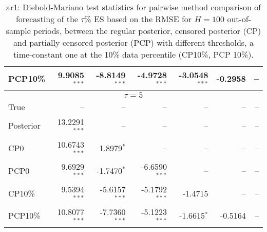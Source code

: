 {{\begin{table}
\begin{tabular}{l | rrrrrr}
PCP10\% & 9.9085$^{***}$ & -8.8149$^{***}$ & -4.9728$^{***}$ & -3.0548$^{***}$ & -0.2958\phantom{$^{***}$} &    --\phantom{$^{***}$}   \\ 
\hline 
\multicolumn{7}{c}{$\tau = 5$} \\ \hline 
True &    --\phantom{$^{***}$} &    --\phantom{$^{***}$} &    --\phantom{$^{***}$} &    --\phantom{$^{***}$} &    --\phantom{$^{***}$} &    --\phantom{$^{***}$}   \\ 
Posterior & 13.2291$^{***}$ &    --\phantom{$^{***}$} &    --\phantom{$^{***}$} &    --\phantom{$^{***}$} &    --\phantom{$^{***}$} &    --\phantom{$^{***}$}   \\ 
CP0 & 10.6743$^{***}$ & 1.8979$^{*}$\phantom{$^{**}$} &    --\phantom{$^{***}$} &    --\phantom{$^{***}$} &    --\phantom{$^{***}$} &    --\phantom{$^{***}$}   \\ 
PCP0 & 9.6929$^{***}$ & -1.7470$^{*}$\phantom{$^{**}$} & -6.6590$^{***}$ &    --\phantom{$^{***}$} &    --\phantom{$^{***}$} &    --\phantom{$^{***}$}   \\ 
CP10\% & 9.5394$^{***}$ & -5.6157$^{***}$ & -5.1792$^{***}$ & -1.4715\phantom{$^{***}$} &    --\phantom{$^{***}$} &    --\phantom{$^{***}$}   \\ 
PCP10\% & 10.8077$^{***}$ & -7.7360$^{***}$ & -5.1223$^{***}$ & -1.6615$^{*}$\phantom{$^{**}$} & -0.5164\phantom{$^{***}$} &    --\phantom{$^{***}$}   \\ 
\hline 
\end{tabular}
 \caption{ar1: Diebold-Mariano test statistics for pairwise method comparison  of forecasting of the $\tau$\%  ES based on  the RMSE for $H=100$ out-of-sample periods,  between  the regular posterior, censored posterior (CP) and  partially censored posterior (PCP) with different thresholds,  a time-constant one at the 10\% data percentile (CP10\%, PCP 10\%). }
\label{tab:ar1_DM_es_T100}  
\end{table}
}}